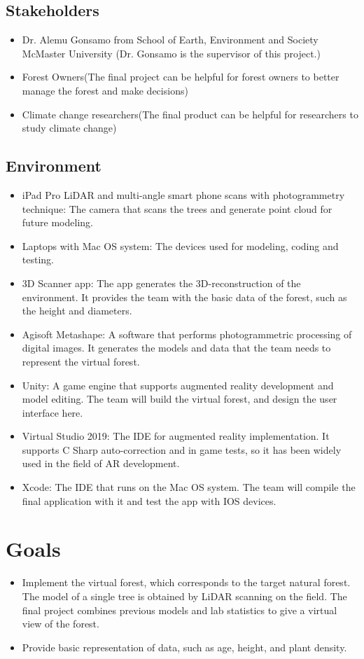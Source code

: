 \documentclass{article}
\begin{document}
\subsection{Stakeholders}
\begin{itemize}
    \item Dr. Alemu Gonsamo from School of Earth, Environment and Society McMaster University (Dr. Gonsamo is the supervisor of this project.)
    \item Forest Owners(The final project can be helpful for forest owners to better manage the 
    forest and make decisions)\\
    \item Climate change researchers(The final product can be helpful for researchers to 
    study climate change)
\end{itemize}
\subsection{Environment}
\begin{itemize}
    \item iPad Pro LiDAR and multi-angle smart phone scans with photogrammetry technique: The camera that scans the trees and generate point cloud for future modeling.
    \item Laptops with Mac OS system: The devices used for modeling, coding and testing.
    \item 3D Scanner app: The app generates the 3D-reconstruction of the environment. It provides the team with the basic data of the forest, such as the height and diameters.
    \item Agisoft Metashape: A software that performs photogrammetric processing of digital images. It generates the models and data that the team needs to represent the virtual forest.
    \item Unity: A game engine that supports augmented reality development and model editing. The team will build the virtual forest, and design the user interface here.
    \item Virtual Studio 2019: The IDE for augmented reality implementation. It supports C Sharp auto-correction and in game tests, so it has been widely used in the field of AR development.
    \item Xcode: The IDE that runs on the Mac OS system. The team will compile the final application with it and test the app with IOS devices.
\end{itemize}

\section{Goals}
\begin{itemize}
    \item Implement the virtual forest, which corresponds to the target natural forest. The model of a single tree is obtained by LiDAR scanning on the field. The final project combines previous models and lab statistics to give a virtual view of the forest. 
    \item Provide basic representation of data, such as age, height, and plant density. 
\end{itemize}
\end{document}
